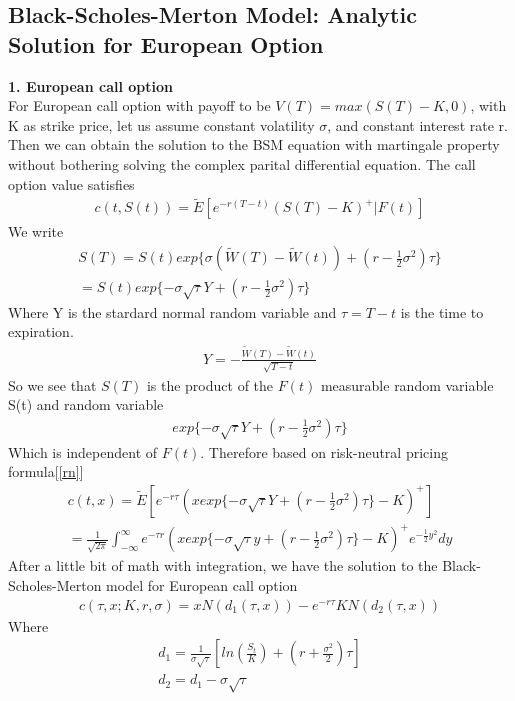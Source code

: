 \documentclass[a4paper]{article}
\begin{document}
\subsection{Black-Scholes-Merton Model: Analytic Solution for European Option}
{\bf1. European call option}\\
For European call option with payoff to be $V(T) = max(S(T) - K, 0)$, with K as strike price, let us assume constant volatility $\sigma$, and constant interest rate r. 
Then we can obtain the solution to the BSM equation with martingale property without bothering solving the complex parital
differential equation. The call option value satisfies
\begin{align*}
	c(t, S(t)) = \tilde E[e^{-r(T-t)}(S(T)-K)^+|F(t)]
\end{align*}
We write
\begin{align*}
	S(T) = S(t) exp\{\sigma(\tilde W(T) -\tilde W(t)) + (r - \frac{1}{2} \sigma^2) \tau\} \\
	     = S(t) exp\{-\sigma \sqrt{\tau} Y + (r - \frac{1}{2}\sigma^2)\tau\}
\end{align*}
Where Y is the stardard normal random variable and $\tau = T - t$ is the time to expiration. 
\begin{align*}
        Y = -\frac{\tilde W(T) - \tilde W(t)}{\sqrt{T - t}}
\end{align*}
So we see that $S(T)$ is the product of the $F(t)$ measurable random variable S(t) and random variable
\begin{align*}
        exp\{-\sigma \sqrt{\tau} Y +(r - \frac{1}{2} \sigma^2) \tau \}
\end{align*}
Which is independent of $F(t)$.
Therefore based on risk-neutral pricing formula[\ref{rn}]
\begin{align*}
        c(t,x) = \tilde E[e^{-r\tau}(x exp\{ -\sigma \sqrt{\tau} Y + (r - \frac{1}{2} \sigma^2)\tau\} -K)^+]\\
        = \frac{1}{\sqrt{2\pi}} \int_{-\infty}^{\infty} e^{-\tau r}(x exp\{-\sigma \sqrt{\tau} y
        +(r -\frac{1}{2}\sigma^2)\tau \} -K)^+ e^{-\frac{1}{2}y^2} dy
\end{align*}
After a little bit of math with integration, we have the solution to the Black-Scholes-Merton model for European call option
\begin{align*}
	c(\tau,x; K, r, \sigma) = xN(d_1(\tau,x)) - e^{-r\tau}KN(d_2(\tau,x))
\end{align*}
Where
\begin{align*}
	d_1 = \frac{1}{\sigma \sqrt{\tau}}[ln(\frac{S_t}{K}) + (r+ \frac{\sigma^2}{2})\tau] \\
	d_2 = d_1 - \sigma \sqrt{\tau}
\end{align*}
\end{document}
